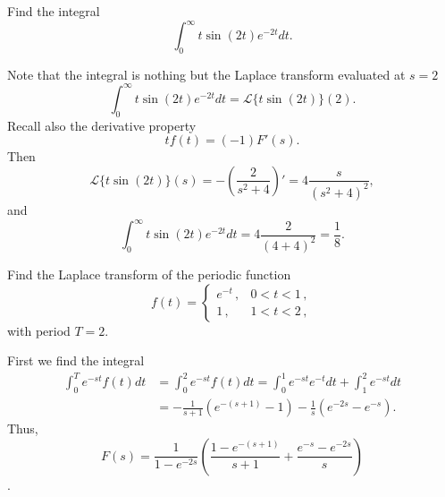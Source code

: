 \documentclass[11pt]{article}
\begin{document}
\begin{problem}
Find the integral
\[\int_{0}^{\infty}t\sin (2t) e^{-2t}dt.\]
\end{problem}
\begin{solution}
Note that the integral is nothing but the Laplace transform evaluated at $s=2$
\[\int_{0}^{\infty}t\sin (2t) e^{-2t}dt = \mathcal{L}\{t\sin (2t)\}(2).\]
Recall also the derivative property 
\[tf(t)=(-1)F'(s).\]
Then 
\[\mathcal{L}\{t\sin (2t)\}(s)=-\left( \frac{2}{s^{2}+4} \right)'=4 \frac{s}{(s^{2}+4)^{2}},\]
and 
\[\boxed{\int_{0}^{\infty}t\sin (2t) e^{-2t}dt=4 \frac{2}{(4+4)^{2}}=\frac{1}{8}.}\]
\end{solution}


\begin{problem}
Find the Laplace transform of the periodic function
\[f(t)=\left\{\begin{array}{ll}
        e^{-t}\,, & 0<t<1\,,\\
        1\,, & 1<t<2\,,
       \end{array}\right.
\]
with period $T=2$.
\end{problem}
\begin{solution}
First we find the integral
\begin{equation*}\begin{split}
\int_{0}^{T}e^{-st}f(t)dt & = \int_{0}^{2}e^{-st}f(t)dt=\int_{0}^{1}e^{-st}e^{-t}dt + \int_{1}^{2}e^{-st}dt \\ &=-\frac{1}{s+1}\left( e^{-(s+1)} -1 \right) - \frac{1}{s}\left( e^{-2s} - e^{-s} \right).\end{split}
\end{equation*}
Thus,
\[\boxed{F(s) = \frac{1}{1-e^{-2s}}\left( \frac{1-e^{-(s+1)}}{s+1} + \frac{e^{-s}-e^{-2s}}{s} \right)}\].
\end{solution}
\end{document}
